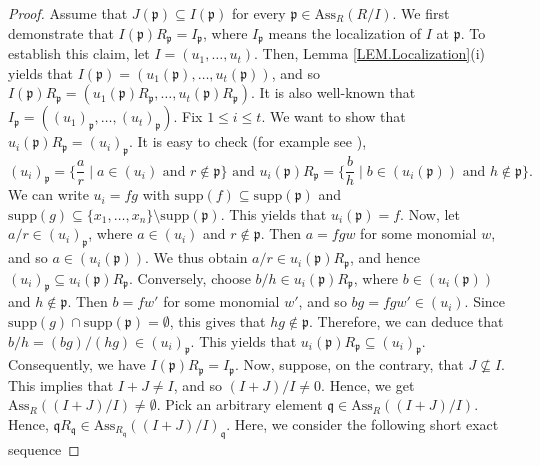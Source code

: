 \documentclass[11pt]{amsart}
\begin{document}
  
 \begin{proof}
 Assume that   $J(\mathfrak{p})\subseteq I(\mathfrak{p})$   for  every   $\mathfrak{p}\in \mathrm{Ass}_R(R/I)$. We first demonstrate  that $I(\mathfrak{p})R_{\mathfrak{p}}=I_{\mathfrak{p}}$, where $I_{\mathfrak{p}}$ means the localization of $I$ at $\mathfrak{p}$. To establish this claim, 
 let  $I=(u_1, \ldots, u_t)$. Then, Lemma \ref{LEM.Localization}(i) yields that  $I({\mathfrak{p}})=(u_1({\mathfrak{p}}), \ldots, u_t({\mathfrak{p}}))$, 
 and so    $I({\mathfrak{p}})R_{\mathfrak{p}}=(u_1({\mathfrak{p}})R_{\mathfrak{p}}, \ldots, u_t({\mathfrak{p}})R_{\mathfrak{p}})$. 
 It is also well-known that $I_{\mathfrak{p}}=(({u_1})_{\mathfrak{p}}, \ldots, ({u_t})_{\mathfrak{p}})$. Fix $1\leq i \leq t$. We want to 
 show that $u_i({\mathfrak{p}})R_{\mathfrak{p}}=({u_i})_{\mathfrak{p}}$. It is easy  to check  (for example see \cite[Lemma 5.25]{sharp}),  
 $$({u_i})_{\mathfrak{p}}=\{\frac{a}{r} \mid a\in (u_i) \text{~and~} r\notin \mathfrak{p}\} \text{~and~} {u_i}(\mathfrak{p})R_{\mathfrak{p}}
 =\{\frac{b}{h} \mid b\in  (u_i(\mathfrak{p})) \text{~and~} h\notin \mathfrak{p}\} .$$
 We can write $u_i=fg$ with $\mathrm{supp}(f)\subseteq \mathrm{supp}(\mathfrak{p})$ and $\mathrm{supp}(g)\subseteq 
 \{x_1, \ldots, x_n\} \setminus  \mathrm{supp}(\mathfrak{p})$. This yields that $u_i(\mathfrak{p})=f$. Now, let $a/r \in  ({u_i})_{\mathfrak{p}}$, where $a\in (u_i)$ and   $r\notin \mathfrak{p}$.  Then $a=fgw$ for some monomial $w$, and so $a\in (u_i(\mathfrak{p}))$.
  We thus obtain $a/r \in  {u_i}(\mathfrak{p})R_{\mathfrak{p}}$, and hence $({u_i})_{\mathfrak{p}} \subseteq {u_i}(\mathfrak{p})R_{\mathfrak{p}}$. 
  Conversely, choose $b/h\in {u_i}(\mathfrak{p})R_{\mathfrak{p}}$, where $b\in  (u_i(\mathfrak{p}))$ and $h\notin \mathfrak{p}.$ 
  Then $b=fw'$ for some monomial $w'$, and so $bg=fgw'\in ({u_i})$. Since $\mathrm{supp}(g) \cap \mathrm{supp}(\mathfrak{p})=\emptyset$, this gives that 
  $hg\notin \mathfrak{p}$. Therefore, we can deduce that  $b/h=(bg)/(hg)\in ({u_i})_{\mathfrak{p}}.$
  This yields  that  ${u_i}(\mathfrak{p})R_{\mathfrak{p}} \subseteq ({u_i})_{\mathfrak{p}}$. Consequently, we have $I(\mathfrak{p})R_{\mathfrak{p}}=I_{\mathfrak{p}}$.  Now, suppose, on the contrary, that $J\nsubseteq  I$. 
  This implies that $I+J \neq I$, and so $(I+J)/I\neq 0$. Hence, we get 
 $\mathrm{Ass}_R((I+J)/I)\neq \emptyset$.   Pick an arbitrary element $\mathfrak{q}\in \mathrm{Ass}_R((I+J)/I)$. Hence, 
 $\mathfrak{q}R_{\mathfrak{q}}\in \mathrm{Ass}_{R_{\mathfrak{q}}}((I+J)/I)_{\mathfrak{q}}$.   Here, we   consider the following short exact sequence

\end{proof}
\end{document}
